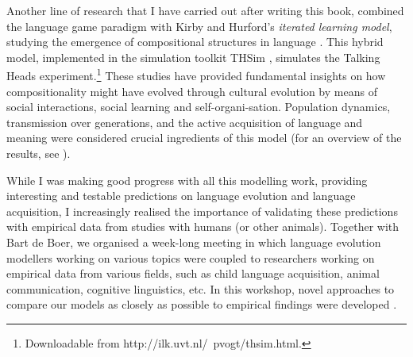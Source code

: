 Another line of research that I have carried out after writing this book, combined the language game paradigm with Kirby and Hurford's \citeyear{kirbyhurford:2002} {\em iterated learning model}, studying the emergence of compositional structures in language \citep{vogt:2005a,vogt:2005b}. This hybrid model, implemented in the simulation toolkit THSim \citep{vogt:2003c}, simulates the Talking Heads experiment.\footnote{Downloadable from http://ilk.uvt.nl/~{}pvogt/thsim.html.} These studies have provided fundamental insights on how compositionality might have evolved through cultural evolution by means of social interactions, social learning and self-organi-sation. Population dynamics, transmission over generations, and the active acquisition of language and meaning were considered crucial ingredients of this model (for an overview of the results, see \citet{vogt:2007b}).  

While I was making good progress with all this modelling work, providing interesting and testable predictions on language evolution and language acquisition, I increasingly realised the importance of validating these predictions with empirical data from studies with humans (or other animals). Together with Bart de Boer, we organised a week-long meeting in which language evolution modellers working on various topics were coupled to researchers working on empirical data from various fields, such as child language acquisition, animal communication, cognitive linguistics, etc. In this workshop, novel approaches to compare our models as closely as possible to empirical findings were developed \citep{vogtdeboer:2010}.

